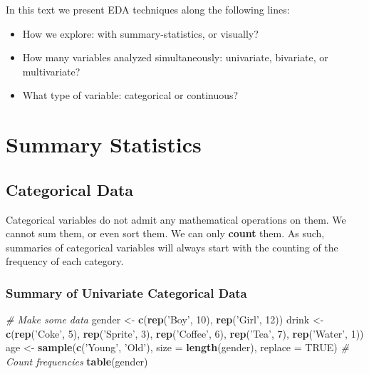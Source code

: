 \documentclass[]{book}
\newenvironment{Shaded}{\begin{snugshade}}{\end{snugshade}}
\newcommand{\CommentTok}[1]{\textcolor[rgb]{0.56,0.35,0.01}{\textit{#1}}}
\newcommand{\DataTypeTok}[1]{\textcolor[rgb]{0.13,0.29,0.53}{#1}}
\newcommand{\DecValTok}[1]{\textcolor[rgb]{0.00,0.00,0.81}{#1}}
\newcommand{\KeywordTok}[1]{\textcolor[rgb]{0.13,0.29,0.53}{\textbf{#1}}}
\newcommand{\NormalTok}[1]{#1}
\newcommand{\OtherTok}[1]{\textcolor[rgb]{0.56,0.35,0.01}{#1}}
\newcommand{\StringTok}[1]{\textcolor[rgb]{0.31,0.60,0.02}{#1}}
\providecommand{\tightlist}{%
  \setlength{\itemsep}{0pt}\setlength{\parskip}{0pt}}
\theoremstyle{definition}
\theoremstyle{definition}
\theoremstyle{definition}
\theoremstyle{remark}
\begin{document}
In this text we present EDA techniques along the following lines:

\begin{itemize}
\tightlist
\item
  How we explore: with summary-statistics, or visually?
\item
  How many variables analyzed simultaneously: univariate, bivariate, or multivariate?
\item
  What type of variable: categorical or continuous?
\end{itemize}

\hypertarget{summary-statistics}{%
\section{Summary Statistics}\label{summary-statistics}}

\hypertarget{categorical-data}{%
\subsection{Categorical Data}\label{categorical-data}}

Categorical variables do not admit any mathematical operations on them.
We cannot sum them, or even sort them.
We can only \textbf{count} them.
As such, summaries of categorical variables will always start with the counting of the frequency of each category.

\hypertarget{summary-of-univariate-categorical-data}{%
\subsubsection{Summary of Univariate Categorical Data}\label{summary-of-univariate-categorical-data}}

\begin{Shaded}
\begin{Highlighting}[]
\CommentTok{# Make some data}
\NormalTok{gender <-}\StringTok{ }\KeywordTok{c}\NormalTok{(}\KeywordTok{rep}\NormalTok{(}\StringTok{'Boy'}\NormalTok{, }\DecValTok{10}\NormalTok{), }\KeywordTok{rep}\NormalTok{(}\StringTok{'Girl'}\NormalTok{, }\DecValTok{12}\NormalTok{))}
\NormalTok{drink <-}\StringTok{ }\KeywordTok{c}\NormalTok{(}\KeywordTok{rep}\NormalTok{(}\StringTok{'Coke'}\NormalTok{, }\DecValTok{5}\NormalTok{), }\KeywordTok{rep}\NormalTok{(}\StringTok{'Sprite'}\NormalTok{, }\DecValTok{3}\NormalTok{), }\KeywordTok{rep}\NormalTok{(}\StringTok{'Coffee'}\NormalTok{, }\DecValTok{6}\NormalTok{), }\KeywordTok{rep}\NormalTok{(}\StringTok{'Tea'}\NormalTok{, }\DecValTok{7}\NormalTok{), }\KeywordTok{rep}\NormalTok{(}\StringTok{'Water'}\NormalTok{, }\DecValTok{1}\NormalTok{))  }
\NormalTok{age <-}\StringTok{  }\KeywordTok{sample}\NormalTok{(}\KeywordTok{c}\NormalTok{(}\StringTok{'Young'}\NormalTok{, }\StringTok{'Old'}\NormalTok{), }\DataTypeTok{size =} \KeywordTok{length}\NormalTok{(gender), }\DataTypeTok{replace =} \OtherTok{TRUE}\NormalTok{)}
\CommentTok{# Count frequencies}
\KeywordTok{table}\NormalTok{(gender)}
\end{Highlighting}
\end{Shaded}
\end{document}
